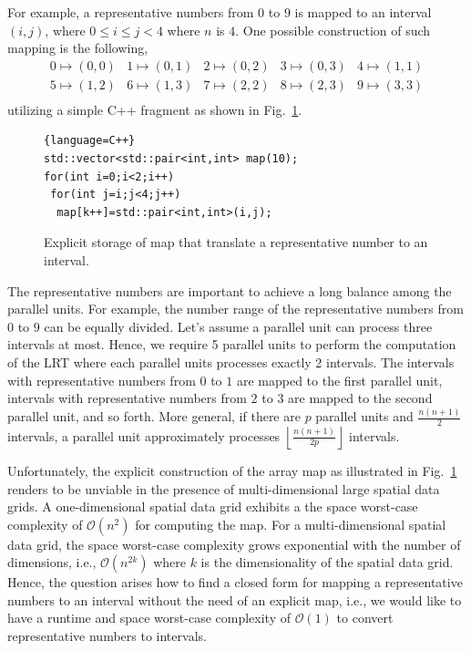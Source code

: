 \documentclass[AMA,LATO1COL]{WileyNJD-v2}
\newcommand\bigo{\mathcal O}
\begin{document}
For example, a representative numbers from $0$ to $9$ is mapped to an interval $(i,j)$,  where $0 \leq i \leq j < 4$ where $n$ is $4$.  One possible construction of such mapping is the following,
\begin{equation*}
\begin{array}{lllll}
0 \mapsto (0,0)  &
1 \mapsto (0,1)  &
2 \mapsto (0,2)  &
3 \mapsto (0,3)  &
4 \mapsto (1,1)  \\
5 \mapsto (1,2)  &
6 \mapsto (1,3)  &
7 \mapsto (2,2) &
8 \mapsto (2,3) &
9 \mapsto (3,3) \\
\end{array}
\end{equation*}
utilizing a simple C++ fragment as shown in Fig.~\ref{alg:explicit-map}.
\begin{figure}
\begin{lstlisting}{language=C++}
std::vector<std::pair<int,int> map(10);
for(int i=0;i<2;i++)
 for(int j=i;j<4;j++)
  map[k++]=std::pair<int,int>(i,j);
\end{lstlisting}
\caption{Explicit storage of map that translate a representative number to an interval.}
\label{alg:explicit-map}
\end{figure}
The representative numbers are important to achieve a long balance among the parallel units.  For example, the number range of the representative numbers from $0$ to $9$ can be equally divided. Let's assume a parallel unit can process three intervals at most. Hence, we require 5 parallel units to perform the computation of the LRT where each parallel units processes exactly 2 intervals. The intervals with representative numbers from $0$ to $1$ are mapped to the first parallel unit, intervals with representative numbers from $2$ to $3$ are mapped to the second parallel unit, and so forth. More general, if there are $p$ parallel units and $\frac{n(n+1)}{2}$ intervals, a parallel unit  approximately processes $\left \lfloor \frac{n(n+1)}{2 p} \right\rfloor$ intervals.

Unfortunately, the explicit construction of the array map as illustrated in Fig.~\ref{alg:explicit-map} renders to be unviable in the presence of multi-dimensional large spatial data grids. A one-dimensional spatial data grid exhibits a the space worst-case complexity of $\bigo(n^2)$ for computing the map. For a multi-dimensional spatial data grid, the space worst-case complexity grows exponential with the number of dimensions, i.e., $\bigo(n^{2k})$ where $k$ is the dimensionality of the spatial data grid.  Hence, the question arises how to find a closed form for mapping a representative numbers to an interval without the need of an explicit map, i.e., we would like to have a runtime and space worst-case complexity of $\bigo(1)$ to convert representative numbers to intervals.
\end{document}
